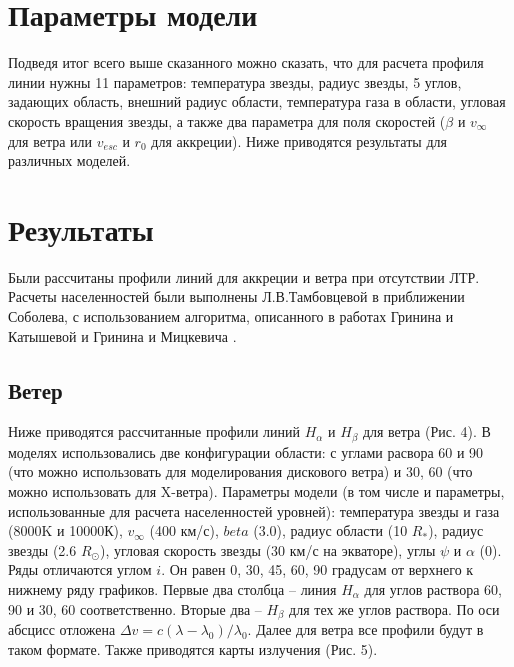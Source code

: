 \documentclass{article}
\begin{document}
\section{Параметры модели}

Подведя итог всего выше сказанного можно сказать, что для расчета профиля линии нужны 11 параметров: температура звезды, радиус звезды, 5 углов, задающих область, внешний радиус области, температура газа в области, угловая скорость вращения звезды, а также два параметра для поля скоростей ($\beta$ и $v_{\infty}$ для ветра или $v_{esc}$ и $r_0$ для аккреции). Ниже приводятся результаты для различных моделей.

\section{Результаты}

Были рассчитаны профили линий для аккреции и ветра при отсутствии ЛТР. Расчеты населенностей были выполнены Л.В.Тамбовцевой в приближении Соболева, с использованием алгоритма, описанного в работах Гринина и Катышевой \cite{grinin80} и Гринина и Мицкевича \cite{grinin90}.

\subsection{Ветер}

Ниже приводятся рассчитанные профили линий $H_\alpha$ и $H_\beta$ для ветра (Рис. 4). В моделях использовались две конфигурации области: с углами расвора 60 и 90 (что можно использовать для моделирования дискового ветра) и 30, 60 (что можно использовать для X-ветра). Параметры модели (в том числе и параметры, использованные для расчета населенностей уровней): температура звезды и газа (8000K и 10000К), $v_\infty$ (400 км/с), $beta$ (3.0), радиус области (10 $R_\ast$), радиус звезды (2.6 $R_\odot$), угловая скорость звезды (30 км/с на экваторе), углы $\psi$ и $\alpha$ (0). Ряды отличаются углом $i$. Он равен 0, 30, 45, 60, 90 градусам от верхнего к нижнему ряду графиков. Первые два столбца -- линия $H_\alpha$ для углов раствора 60, 90 и 30, 60 соответственно. Вторые два -- $H_\beta$ для тех же углов раствора. По оси абсцисс отложена $\Delta v = c(\lambda - \lambda_0) / \lambda_0 $. Далее для ветра все профили будут в таком формате. Также приводятся карты излучения (Рис. 5).
\end{document}
